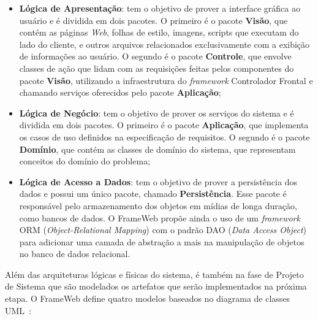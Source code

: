 \begin{itemize}
    \item \textbf{Lógica de Apresentação}: tem o objetivo de prover a interface gráfica
        ao usuário e é dividida em dois pacotes. O primeiro é o pacote \textbf{Visão},
        que contém as páginas \textit{Web}, folhas de estilo, imagens, scripts que executam do lado do cliente,
        e outros arquivos relacionados exclusivamente com a exibição de informações ao usuário.
        O segundo é o pacote \textbf{Controle}, que envolve classes de ação que lidam com as requisições
        feitas pelos componentes do pacote \textbf{Visão}, utilizando a infraestrutura do \textit{framework} 
        Controlador Frontal e chamando serviços oferecidos pelo pacote \textbf{Aplicação};

    \item \textbf{Lógica de Negócio}: tem o objetivo de prover os serviços do sistema e é dividida
        em dois pacotes. O primeiro é o pacote \textbf{Aplicação}, que implementa os casos de uso 
        definidos na especificação de requisitos. O segundo é o pacote \textbf{Domínio}, que contém 
        as classes de domínio do sistema, que representam conceitos do domínio do problema;

    \item \textbf{Lógica de Acesso a Dados}: tem o objetivo de prover a persistência dos dados e 
        possui um único pacote, chamado \textbf{Persistência}. Esse pacote é responsável pelo armazenamento
        dos objetos em mídias de longa duração, como bancos de dados. O FrameWeb propõe ainda o uso de um
        \textit{framework} ORM (\textit{Object-Relational Mapping}) com o padrão DAO (\textit{Data Access Object})~\cite{alur:2003}
        para adicionar uma camada de abstração a mais na manipulação de objetos no banco de dados relacional.
\end{itemize}

Além das arquiteturas lógicas e físicas do sistema, é também na fase de Projeto de Sistema
que são modelados os artefatos que serão implementados na próxima etapa. O FrameWeb define
quatro modelos baseados no diagrama de classes UML~\cite{souza:2007,souza:2020}:


